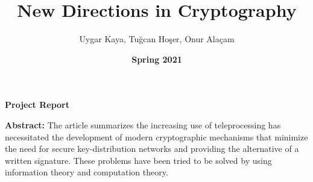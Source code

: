\documentclass{article}
\title{\textbf{New Directions in Cryptography}}
\author{Uygar Kaya, Tuğcan Hoşer, Onur Alaçam}
\date{\textbf{Spring 2021}}
\begin{document}
\maketitle

\begin{center}
    \textbf{Project Report}
\end{center}

\vspace{127mm}

\begin{flushleft}

\vspace{2cm}

\textbf{Abstract:}
The article summarizes the increasing use of teleprocessing has necessitated the development of modern cryptographic mechanisms that minimize the need for secure key-distribution networks and providing the alternative of a written signature. These problems have been tried to be solved by using information theory and computation theory.\newline 
\end{flushleft}

\vspace{161mm}
\end{document}
